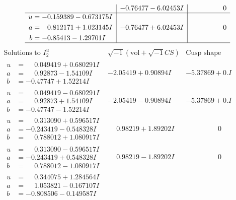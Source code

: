 \documentclass[1p]{elsarticle_modified}
\theoremstyle{definition}
\newcommand{\I}{\sqrt{-1}}
\begin{document}
$$\begin{array}{c|c|c}
 & -0.76477 - 6.02453 I & \phantom{-0.000000 } 0 \\ \hline\begin{aligned}
u &= -0.159389 - 0.673175 I \\
a &= \phantom{-}0.812171 + 1.023145 I \\
b &= -0.85413 - 1.29701 I\end{aligned}
 & -0.76477 + 6.02453 I & \phantom{-0.000000 } 0\\
 \hline 
 \end{array}$$\newpage$$\begin{array}{c|c|c}  
\text{Solutions to }I^u_{2}& \I (\text{vol} + \sqrt{-1}CS) & \text{Cusp shape}\\
 \hline 
\begin{aligned}
u &= \phantom{-}0.049419 + 0.680291 I \\
a &= \phantom{-}0.92873 - 1.54109 I \\
b &= -0.47747 + 1.52214 I\end{aligned}
 & -2.05419 + 0.90894 I & -5.37869 + 0. I\phantom{ +0.000000I} \\ \hline\begin{aligned}
u &= \phantom{-}0.049419 - 0.680291 I \\
a &= \phantom{-}0.92873 + 1.54109 I \\
b &= -0.47747 - 1.52214 I\end{aligned}
 & -2.05419 - 0.90894 I & -5.37869 + 0. I\phantom{ +0.000000I} \\ \hline\begin{aligned}
u &= \phantom{-}0.313090 + 0.596517 I \\
a &= -0.243419 - 0.548328 I \\
b &= \phantom{-}0.788012 + 1.080917 I\end{aligned}
 & \phantom{-}0.98219 + 1.89202 I & \phantom{-0.000000 } 0 \\ \hline\begin{aligned}
u &= \phantom{-}0.313090 - 0.596517 I \\
a &= -0.243419 + 0.548328 I \\
b &= \phantom{-}0.788012 - 1.080917 I\end{aligned}
 & \phantom{-}0.98219 - 1.89202 I & \phantom{-0.000000 } 0 \\ \hline\begin{aligned}
u &= \phantom{-}0.344075 + 1.284564 I \\
a &= \phantom{-}1.053821 - 0.167107 I \\
b &= -0.808506 - 0.149587 I\end{aligned}

\end{array}$$
\end{document}
